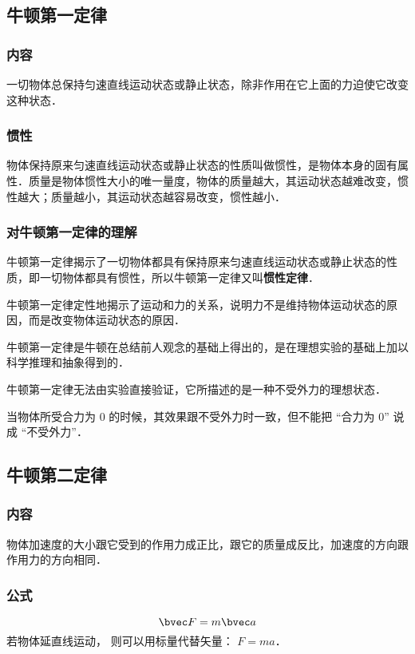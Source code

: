 

\subsection{牛顿第一定律}

\subsubsection{内容}
一切物体总保持匀速直线运动状态或静止状态，除非作用在它上面的力迫使它改变这种状态．

\subsubsection{惯性}
物体保持原来匀速直线运动状态或静止状态的性质叫做惯性，是物体本身的固有属性．质量是物体惯性大小的唯一量度，物体的质量越大，其运动状态越难改变，惯性越大；质量越小，其运动状态越容易改变，惯性越小．

\subsubsection{对牛顿第一定律的理解}
牛顿第一定律揭示了一切物体都具有保持原来匀速直线运动状态或静止状态的性质，即一切物体都具有惯性，所以牛顿第一定律又叫\textbf{惯性定律}．

牛顿第一定律定性地揭示了运动和力的关系，说明力不是维持物体运动状态的原因，而是改变物体运动状态的原因．

牛顿第一定律是牛顿在总结前人观念的基础上得出的，是在理想实验的基础上加以科学推理和抽象得到的．

牛顿第一定律无法由实验直接验证，它所描述的是一种不受外力的理想状态．

当物体所受合力为 $0$ 的时候，其效果跟不受外力时一致，但不能把 “合力为 $0$” 说成 “不受外力”．

\subsection{牛顿第二定律}
\subsubsection{内容}
物体加速度的大小跟它受到的作用力成正比，跟它的质量成反比，加速度的方向跟作用力的方向相同．

\subsubsection{公式}
\begin{equation}\label{HSPM03_eq1}
\bvec F=m\bvec a
\end{equation}
若物体延直线运动， 则可以用标量代替矢量： $F=m a$．

